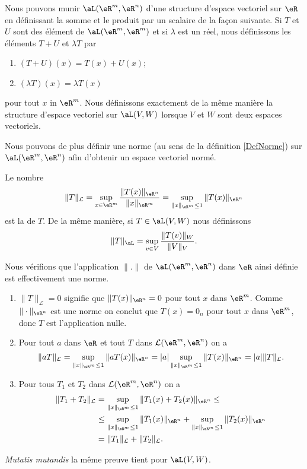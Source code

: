 Nous pouvons munir $\aL(\eR^m, \eR^n)$ d'une structure d'espace vectoriel sur $\eR$ en définissant la somme et le produit par un scalaire de la façon suivante. Si $T$ et $U$ sont des élément de $\aL(\eR^m,\eR^m)$ et si $\lambda$ est un réel, nous définissons les éléments $T+U$ et $\lambda T$ par
\begin{enumerate}
	\item
		$(T+U)(x)=T(x)+U(x)$;
	\item
		$(\lambda T)(x)=\lambda T(x)$
\end{enumerate}
pour tout $x$ in $\eR^m$. Nous définissons exactement de la même manière la structure d'espace vectoriel sur $\aL(V,W)$ lorsque $V$ et $W$ sont deux espaces vectoriels.

Nous pouvons de plus définir une norme (au sens de la définition \ref{DefNorme}) sur $\aL(\eR^m,\eR^n)$ afin d'obtenir un espace vectoriel normé.
\begin{definition}		\label{DefNormeAppLineaire}
	Le nombre
	\begin{equation}
		\|T\|_{\mathcal{L}}=\sup_{x\in\eR^m}\frac{\|T(x)\|_{\eR^n}}{\|x\|_{\eR^m}}=\sup_{\|x\|_{\eR^m}\leq 1}\|T(x)\|_{\eR^n}
	\end{equation}
	est la  de $T$. De la même manière, si $T\in\aL(V,W)$ nous définissons
	\begin{equation}
		\| T \|_{\aL}=\sup_{v\in V}\frac{ \| T(v) \|_W }{ \| V \|_V }.
	\end{equation}
\end{definition}

Nous vérifions que l'application $\| . \|$ de $\aL(\eR^m,\eR^n)$ dans $\eR$ ainsi définie est effectivement une norme.
\begin{enumerate}
\item $\|T\|_{\mathcal{L}}=0$ signifie que $\|T(x)\|_{\eR^n}=0$ pour tout $x$ dans $\eR^m$. Comme  $\|\cdot\|_{\eR^n}$ est une norme on conclut que $T(x)=0_{n}$ pour tout $x$ dans $\eR^m$, donc $T$ est l'application nulle. 
\item Pour tout $a$ dans $\eR$ et tout  $T$ dans $\mathcal{L}(\eR^m, \eR^n)$ on a 
\[
\|aT\|_{\mathcal{L}}=\sup_{\|x\|_{\eR^m}\leq 1}\|aT(x)\|_{\eR^n}=|a|\sup_{\|x\|_{\eR^m}\leq 1}\|T(x)\|_{\eR^n}=|a|\|T\|_{\mathcal{L}}.
\]
\item Pour tous $T_1$ et $T_2$ dans $\mathcal{L}(\eR^m, \eR^n)$ on a 
  \begin{equation}\nonumber
    \begin{aligned}
       \|T_1+ T_2\|_{\mathcal{L}}&=\sup_{\|x\|_{\eR^m}\leq 1}\|T_1(x)+T_2(x)\|_{\eR^n}\leq\\
 &\leq\sup_{\|x\|_{\eR^m}\leq 1}\|T_1(x)\|_{\eR^n} +\sup_{\|x\|_{\eR^m}\leq 1}\|T_2(x)\|_{\eR^n}\\
 &=\|T_1\|_{\mathcal{L}}+\|T_2\|_{\mathcal{L}}.
    \end{aligned}
  \end{equation}
\end{enumerate}
\emph{Mutatis mutandis} la même preuve tient pour $\aL(V,W)$.

